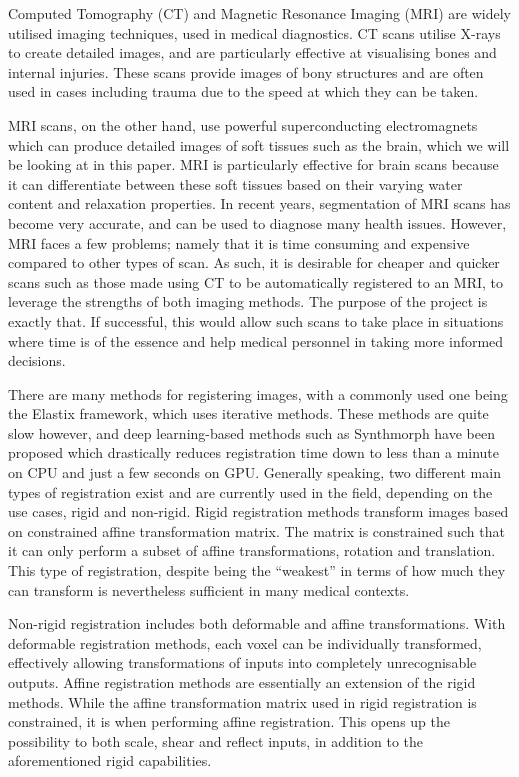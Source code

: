 Computed Tomography (CT) and Magnetic Resonance Imaging (MRI) are widely utilised imaging techniques, used in medical diagnostics. CT scans utilise X-rays to create detailed images, and are particularly effective at visualising bones and internal injuries. These scans provide images of bony structures and are often used in cases including trauma due to the speed at which they can be taken.

MRI scans, on the other hand, use powerful superconducting electromagnets which can produce detailed images of soft tissues such as the brain, which we will be looking at in this paper. MRI is particularly effective for brain scans because it can differentiate between these soft tissues based on their varying water content and relaxation properties. In recent years, segmentation of MRI scans has become very accurate, and can be used to diagnose many health issues. However, MRI faces a few problems; namely that it is time consuming and expensive compared to other types of scan. As such, it is desirable for cheaper and quicker scans such as those made using CT to be automatically registered to an MRI, to leverage the strengths of both imaging methods. The purpose of the project is exactly that. If successful, this would allow such scans to take place in situations where time is of the essence and help medical personnel in taking more informed decisions.

There are many methods for registering images, with a commonly used one being the Elastix framework\cite{elastix}, which uses iterative methods. These methods are quite slow however, and deep learning-based methods such as Synthmorph have been proposed which drastically reduces registration time down to less than a minute on CPU and just a few seconds on GPU\cite{synthmorph}. Generally speaking, two different main types of registration exist and are currently used in the field, depending on the use cases, rigid and non-rigid. Rigid registration methods transform images based on constrained affine transformation matrix. The matrix is constrained such that it can only perform a subset of affine transformations, rotation and translation. This type of registration, despite being the ``weakest'' in terms of how much they can transform is nevertheless sufficient in many medical contexts.

Non-rigid registration includes both deformable and affine transformations. With deformable registration methods, each voxel can be individually transformed, effectively allowing transformations of inputs into completely unrecognisable outputs. Affine registration methods are essentially an extension of the rigid methods. While the affine transformation matrix used in rigid registration is constrained, it is when performing affine registration. This opens up the possibility to both scale, shear and reflect inputs, in addition to the aforementioned rigid capabilities.

